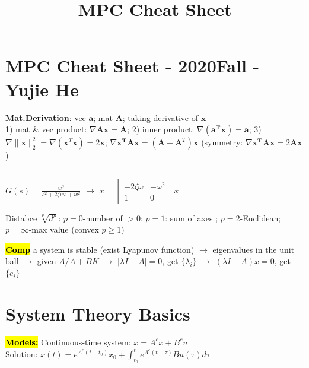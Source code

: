 \documentclass[10pt,a4paper,landscape]{article}
\newcommand{\hlc}[2][yellow]{ {\sethlcolor{#1} \hl{#2}} }
\newcommand{\quadRule}{\vspace{-3pt}\rule{0.23\textwidth}{0.4pt}}
\newcommand{\comp}{\footnotesize{\hlc[cyan]{\textbf{Comp}}}} %
\begin{document}
\title{MPC Cheat Sheet}

\raggedright
\footnotesize
\sffamily
\setlength{\columnsep}{2pt}
\begin{multicols*}{4}

\setlength{\premulticols}{1pt}
\setlength{\postmulticols}{1pt}
\setlength{\multicolsep}{1pt}
\setlength{\columnsep}{2pt}

\section{MPC Cheat Sheet - 2020Fall - Yujie He}

\textbf{Mat.Derivation}: vec $\mathbf{a}$; mat $\mathbf{A}$; taking derivative of $\mathbf{x}$ \\
1) mat \& vec product: $\nabla \mathbf{Ax} = \mathbf{A}$; 
2) inner product: $\nabla(\mathbf{a^{T}x})=\mathbf{a} $;
3) $\nabla\|\mathbf{x}\|_{2}^{2}=\nabla\left(\mathbf{x}^{T} \mathbf{x}\right)=2 \mathbf{x}$; $\nabla \mathbf{x^{T}Ax} = (\mathbf{A}+\mathbf{A}^T)\mathbf{x}$ (symmetry: $\nabla \mathbf{x^{T}Ax} = 2\mathbf{A}\mathbf{x}$) 

\quadRule

$G(s) = \frac{w^2}{s^2+2\zeta ws +w^2}$
$\rightarrow$
$\dot{x}=\left[\begin{array}{cc}
-2 \zeta \omega & -\omega^{2} \\
1 & 0
\end{array}\right] x$

Distabce $\sqrt[p]{d^p}$: $p=0$-number of $>0$; $p=1$: sum of axes ; $p=2$-Euclidean; $p=\infty$-max value (convex $p \geq 1$)

\comp a system is stable (exist Lyapunov function) $\rightarrow$ eigenvalues in the unit ball
$\rightarrow$ given $A/A+BK$ $\rightarrow$ $|\lambda I - A |=0$, get $\{\lambda_i\}$ $\rightarrow$ $(\lambda I - A )x=0$, get $\{e_i\}$

\section{System Theory Basics}
\hl{\textbf{Models:}}
Continuous-time system: $\dot{x} = A^c x + B^c u$\\
Solution: $x(t) = e^{A^c(t-t_0)} x_0 + \int_{t_0}^{t} e^{A^c(t-\tau)} B u(\tau) d\tau $


\end{multicols*}
\end{document}
